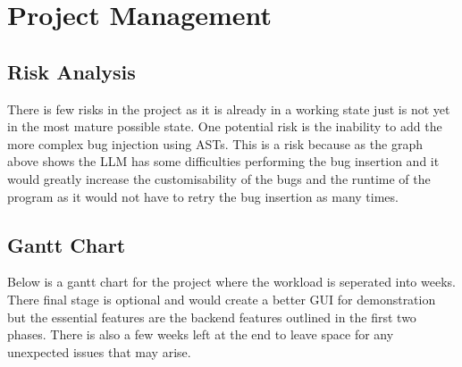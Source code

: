 \documentclass[12pt]{extarticle}
\begin{document}
\section{Project Management}
\subsection{Risk Analysis}
There is few risks in the project as it is already in a working state just is not yet in the most mature possible state. One potential risk is the inability to add the more complex bug injection using ASTs. This is a risk because as the graph above shows the LLM has some difficulties performing the bug insertion and it would greatly increase the customisability of the bugs and the runtime of the program as it would not have to retry the bug insertion as many times. 

\subsection{Gantt Chart}
Below is a gantt chart for the project where the workload is seperated into weeks. There final stage is optional and would create a better GUI for demonstration but the essential features are the backend features outlined in the first two phases. There is also a few weeks left at the end to leave space for any unexpected issues that may arise.
\end{document}
